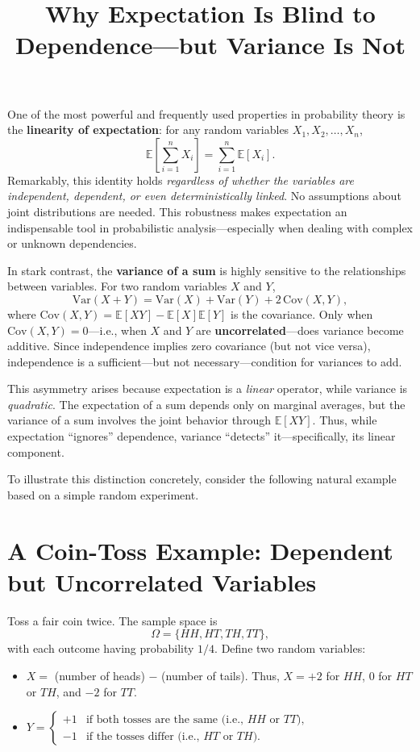 \documentclass{article}
\title{Why Expectation Is Blind to Dependence—but Variance Is Not}
\author{}
\date{}
\begin{document}
\maketitle

\Large

One of the most powerful and frequently used properties in probability theory is the \textbf{linearity of expectation}: for any random variables $X_1, X_2, \dots, X_n$,
\[
\mathbb{E}\!\left[ \sum_{i=1}^n X_i \right] = \sum_{i=1}^n \mathbb{E}[X_i].
\]
Remarkably, this identity holds \textit{regardless of whether the variables are independent, dependent, or even deterministically linked}. No assumptions about joint distributions are needed. This robustness makes expectation an indispensable tool in probabilistic analysis—especially when dealing with complex or unknown dependencies.

In stark contrast, the \textbf{variance of a sum} is highly sensitive to the relationships between variables. For two random variables $X$ and $Y$,
\[
\mathrm{Var}(X + Y) = \mathrm{Var}(X) + \mathrm{Var}(Y) + 2\,\mathrm{Cov}(X, Y),
\]
where $\mathrm{Cov}(X, Y) = \mathbb{E}[XY] - \mathbb{E}[X]\mathbb{E}[Y]$ is the covariance. Only when $\mathrm{Cov}(X, Y) = 0$—i.e., when $X$ and $Y$ are \textbf{uncorrelated}—does variance become additive. Since independence implies zero covariance (but not vice versa), independence is a sufficient—but not necessary—condition for variances to add.

This asymmetry arises because expectation is a \textit{linear} operator, while variance is \textit{quadratic}. The expectation of a sum depends only on marginal averages, but the variance of a sum involves the joint behavior through $\mathbb{E}[XY]$. Thus, while expectation ``ignores'' dependence, variance ``detects'' it—specifically, its linear component.

To illustrate this distinction concretely, consider the following natural example based on a simple random experiment.

\section*{A Coin-Toss Example: Dependent but Uncorrelated Variables}

Toss a fair coin twice. The sample space is
\[
\Omega = \{HH, HT, TH, TT\},
\]
with each outcome having probability $1/4$. Define two random variables:

\begin{itemize}
\item $X =$ (number of heads) $-$ (number of tails).  
    Thus, $X = +2$ for $HH$, $0$ for $HT$ or $TH$, and $-2$ for $TT$.
    
    \item $Y = \begin{cases}
        +1 & \text{if both tosses are the same (i.e., } HH \text{ or } TT\text{)}, \\
        -1 & \text{if the tosses differ (i.e., } HT \text{ or } TH\text{)}.
    \end{cases}$
\end{itemize}
\end{document}
